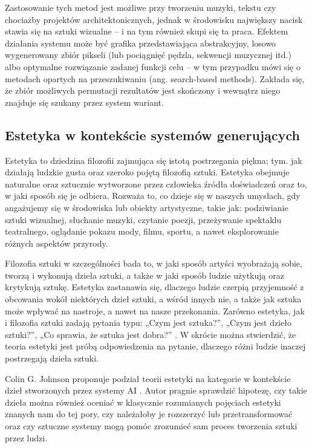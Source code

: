 \documentclass[12pt]{article}
\begin{document}
Zastosowanie tych metod jest możliwe przy tworzeniu muzyki, tekstu czy chociażby projektów architektonicznych, jednak w środowisku największy nacisk stawia się na sztuki wizualne – i na tym również skupi się ta praca. Efektem działania systemu może być grafika przedstawiająca abstrakcyjny, losowo wygenerowany zbiór pikseli (lub pociągnięć pędzla, sekwencji muzycznej itd.) albo optymalne rozwiązanie zadanej funkcji celu – w tym przypadku mówi się o metodach opartych na przeszukiwaniu (ang. search-based methods). Zakłada się, że zbiór możliwych permutacji rezultatów jest skończony i wewnątrz niego znajduje się szukany przez system wariant.

\subsection{Estetyka w kontekście systemów generujących}

\indent

Estetyka to dziedzina filozofii zajmująca się istotą postrzegania piękna; tym. jak działają ludzkie gusta oraz szeroko pojętą filozofią sztuki. Estetyka obejmuje naturalne oraz sztucznie wytworzone przez człowieka źródła doświadczeń oraz to, w jaki sposób się je odbiera. Rozważa to, co dzieje się w naszych umysłach, gdy angażujemy się w środowiska lub obiekty artystyczne, takie jak: podziwianie sztuki wizualnej, słuchanie muzyki, czytanie poezji, przeżywanie spektaklu teatralnego, oglądanie pokazu mody, filmu, sportu, a nawet eksplorowanie różnych aspektów przyrody.

Filozofia sztuki w szczególności bada to, w jaki sposób artyści wyobrażają sobie, tworzą i wykonują dzieła sztuki, a także w jaki sposób ludzie użytkują oraz krytykują sztukę. Estetyka zastanawia się, dlaczego ludzie czerpią przyjemność z obcowania wokół niektórych dzieł sztuki, a wśród innych nie, a także jak sztuka może wpływać na nastroje, a nawet na nasze przekonania. Zarówno estetyka, jak i filozofia sztuki zadają pytania typu: „Czym jest sztuka?”, „Czym jest dzieło sztuki?”, „Co sprawia, że sztuka jest dobra?” \cite{15}. W skrócie można stwierdzić, że teoria estetyki jest próbą odpowiedzenia na pytanie, dlaczego różni ludzie inaczej postrzegają dzieła sztuki.

Colin G. Johnson proponuje podział teorii estetyki na kategorie w kontekście dzieł stworzonych przez systemy AI \cite{1}. Autor pragnie sprawdzić hipotezę, czy takie dzieła można również oceniać w klasycznie rozumianych pojęciach estetyki znanych nam do tej pory, czy należałoby je rozszerzyć lub przetransformować oraz czy sztuczne systemy mogą pomóc zrozumieć sam proces tworzenia sztuki przez ludzi.
\end{document}
